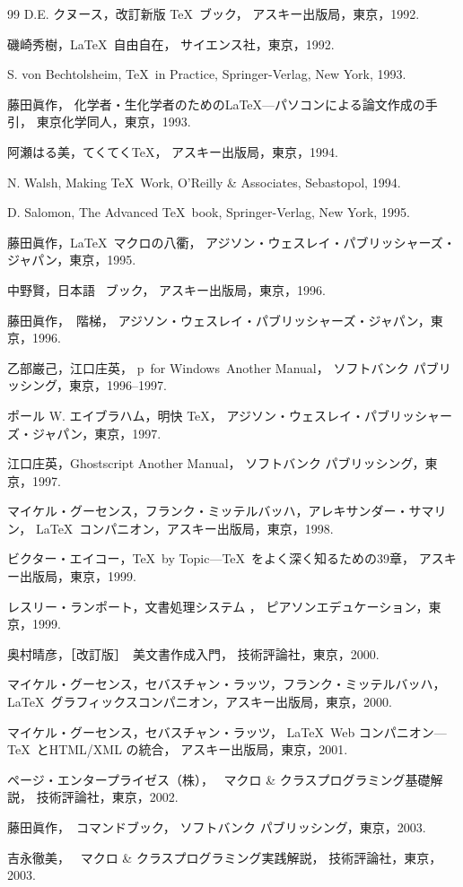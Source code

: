 \documentclass[a4paper,technicalreport]{ieicejsympo}
\begin{document}
\begin{thebibliography}{99}
D.E. クヌース，改訂新版 \TeX\ ブック，
アスキー出版局，東京，1992. 

磯崎秀樹，\LaTeX\ 自由自在，
サイエンス社，東京，1992. 

S. von Bechtolsheim, \TeX\ in Practice, 
Springer-Verlag, New York, 1993. 

藤田眞作，
化学者・生化学者のための\LaTeX---パソコンによる論文作成の手引，
東京化学同人，東京，1993. 

阿瀬はる美，てくてく\TeX{}，
アスキー出版局，東京，1994. 

N. Walsh, Making \TeX\ Work, 
O'Reilly \& Associates, Sebastopol, 1994. 

D. Salomon, The Advanced \TeX\ book, 
Springer-Verlag, New York, 1995.

藤田眞作，\LaTeX\ マクロの八衢，
アジソン・ウェスレイ・パブリッシャーズ・ジャパン，東京，1995. 

中野賢，日本語 \LaTeXe\ ブック，
アスキー出版局，東京，1996. 

藤田眞作，\LaTeXe\ 階梯，
アジソン・ウェスレイ・パブリッシャーズ・ジャパン，東京，1996. 

乙部巌己，江口庄英，
p\LaTeXe\ for Windows\ Another Manual，
ソフトバンク パブリッシング，東京，1996--1997. 

ポール W. エイブラハム，明快 \TeX{}，
アジソン・ウェスレイ・パブリッシャーズ・ジャパン，東京，1997. 

江口庄英，Ghostscript Another Manual，
ソフトバンク パブリッシング，東京，1997. 

マイケル・グーセンス，フランク・ミッテルバッハ，アレキサンダー・サマリン，
\LaTeX\ コンパニオン，アスキー出版局，東京，1998. 

ビクター・エイコー，\TeX\ by Topic---\TeX\ をよく深く知るための39章，
アスキー出版局，東京，1999. 

レスリー・ランポート，文書処理システム \LaTeXe{}，
ピアソンエデュケーション，東京，1999. 

奥村晴彦，［改訂版］\LaTeXe\ 美文書作成入門，
技術評論社，東京，2000. 

マイケル・グーセンス，セバスチャン・ラッツ，フランク・ミッテルバッハ，
\LaTeX\ グラフィックスコンパニオン，アスキー出版局，東京，2000. 

マイケル・グーセンス，セバスチャン・ラッツ，
\LaTeX\ Web コンパニオン---\TeX\ とHTML/XML の統合，
アスキー出版局，東京，2001. 

ページ・エンタープライゼス\<（株）\<，
\LaTeXe\ マクロ \& クラスプログラミング基礎解説，
技術評論社，東京，2002. 

藤田眞作，\LaTeXe\ コマンドブック，
ソフトバンク パブリッシング，東京，2003. 

吉永徹美，
\LaTeXe\ マクロ \& クラスプログラミング実践解説，
技術評論社，東京，2003. 
\end{thebibliography}
\end{document}
